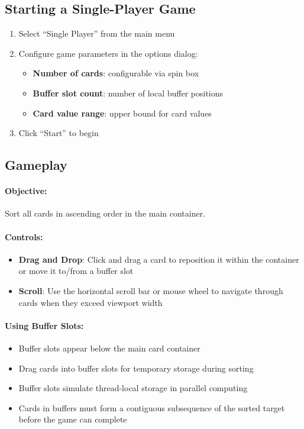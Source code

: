 \subsection{Starting a Single-Player Game}

\begin{enumerate}
    \item Select ``Single Player'' from the main menu
    \item Configure game parameters in the options dialog:
          \begin{itemize}
              \item \textbf{Number of cards}: configurable via spin box
              \item \textbf{Buffer slot count}: number of local buffer positions
              \item \textbf{Card value range}: upper bound for card values
          \end{itemize}
    \item Click ``Start'' to begin
\end{enumerate}

\subsection{Gameplay}

\paragraph*{Objective:}
Sort all cards in ascending order in the main container.

\paragraph*{Controls:}
\begin{itemize}
    \item \textbf{Drag and Drop}: Click and drag a card to reposition it within the container or move it to/from a buffer slot
    \item \textbf{Scroll}: Use the horizontal scroll bar or mouse wheel to navigate through cards when they exceed viewport width
\end{itemize}

\paragraph*{Using Buffer Slots:}
\begin{itemize}
    \item Buffer slots appear below the main card container
    \item Drag cards into buffer slots for temporary storage during sorting
    \item Buffer slots simulate thread-local storage in parallel computing
    \item Cards in buffers must form a contiguous subsequence of the sorted target before the game can complete
\end{itemize}

